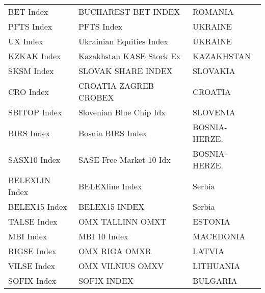 \begin {table}[H]
\begin{center}
\begin{tabu}{| l l l |}
BET Index & BUCHAREST BET INDEX & ROMANIA \\ 
PFTS Index & PFTS Index & UKRAINE \\ 
UX Index & Ukrainian Equities Index & UKRAINE \\ 
KZKAK Index & Kazakhstan KASE Stock Ex & KAZAKHSTAN \\ 
SKSM Index & SLOVAK SHARE INDEX & SLOVAKIA \\ 
CRO Index & CROATIA ZAGREB CROBEX & CROATIA \\ 
SBITOP Index & Slovenian Blue Chip Idx & SLOVENIA \\ 
BIRS Index & Bosnia BIRS Index & BOSNIA-HERZE. \\ 
SASX10 Index & SASE Free Market 10 Idx & BOSNIA-HERZE. \\ 
BELEXLIN Index & BELEXline Index & Serbia \\ 
BELEX15 Index & BELEX15 INDEX & Serbia \\ 
TALSE Index & OMX TALLINN OMXT & ESTONIA \\ 
MBI Index & MBI 10 Index & MACEDONIA \\ 
RIGSE Index & OMX RIGA OMXR & LATVIA \\ 
VILSE Index & OMX VILNIUS OMXV & LITHUANIA \\ 
SOFIX Index & SOFIX INDEX & BULGARIA \\ 

\hline
\end{tabu}
\hspace*{-3cm}
\small
\end{center}
\end{table}


